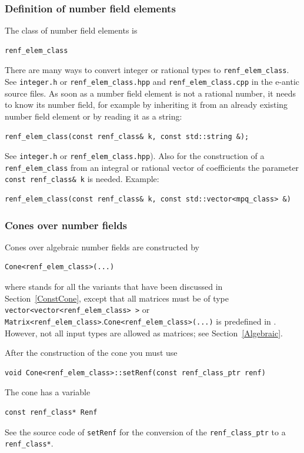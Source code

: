 \begin{small}
\subsubsection{Definition of number field elements}

The class of number field elements is
\begin{Verbatim}
renf_elem_class
\end{Verbatim}
There are many ways to convert integer or rational types to \verb*|renf_elem_class|. See \verb*|integer.h| or \verb*|renf_elem_class.hpp| and \verb*|renf_elem_class.cpp| in the e-antic source files. As soon as a number field element is not a rational number, it needs to know its number field, for example by inheriting it from an already existing number field element or by reading it as a string:
\begin{Verbatim}
renf_elem_class(const renf_class& k, const std::string &);
\end{Verbatim}
See \verb*|integer.h| or \verb*|renf_elem_class.hpp|). Also for the construction of a \verb*|renf_elem_class| from an integral or rational vector of coefficients the parameter \verb*|const renf_class& k| is needed. Example:
\begin{Verbatim}
renf_elem_class(const renf_class& k, const std::vector<mpq_class> &)
\end{Verbatim}

\subsubsection{Cones over number fields}

Cones over algebraic number fields are constructed by
\begin{Verbatim}
Cone<renf_elem_class>(...)
\end{Verbatim}
where  stands for all the variants that have been discussed in Section~\ref{ConstCone}, except that all matrices must be of type \verb+vector<vector<renf_elem_class> >+ or \verb+Matrix<renf_elem_class>+.\newline  \verb|Cone<renf_elem_class>(...)| is predefined in . 
However, not all input types are allowed as matrices; see Section~\ref{Algebraic}.

After the construction of the cone you must use
\begin{Verbatim}
void Cone<renf_elem_class>::setRenf(const renf_class_ptr renf)
\end{Verbatim}
The cone has a variable
\begin{Verbatim}
const renf_class* Renf
\end{Verbatim}
See the source code of \verb*|setRenf| for the conversion of the \verb*|renf_class_ptr| to a \verb*|renf_class*|.


\end{small}
